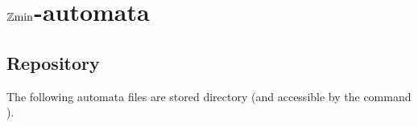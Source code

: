






\section{$\mathbb{Z}\mathrm{min}$-automata}
\subsection{Repository}

The following automata files are stored
 directory (and accessible by the command
).

\subsubsection{}

